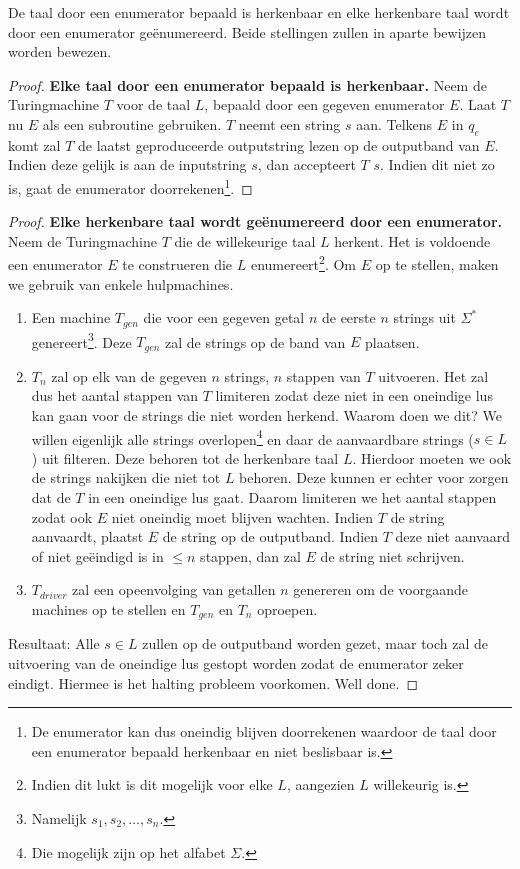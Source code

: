 \begin{theorem}
	De taal door een enumerator bepaald is herkenbaar en elke herkenbare taal wordt door een enumerator ge\"enumereerd. Beide stellingen zullen in aparte bewijzen worden bewezen.
\end{theorem}

\begin{proof}
	\textbf{Elke taal door een enumerator bepaald is herkenbaar.} Neem de Turingmachine $T$ voor de taal $L$, bepaald door een gegeven enumerator $E$. Laat $T$ nu $E$ als een subroutine gebruiken. $T$ neemt een string $s$ aan. Telkens $E$ in $q_e$ komt zal $T$ de laatst geproduceerde outputstring lezen op de outputband van $E$. Indien deze gelijk is aan de inputstring $s$, dan accepteert $T$ $s$. Indien dit niet zo is, gaat de enumerator doorrekenen\footnote{De enumerator kan dus oneindig blijven doorrekenen waardoor de taal door een enumerator bepaald herkenbaar en niet beslisbaar is.}.
\end{proof}

\begin{proof}
	\textbf{Elke herkenbare taal wordt ge\"enumereerd door een enumerator.} Neem de Turingmachine $T$ die de willekeurige taal $L$ herkent. Het is voldoende een enumerator $E$ te construeren die $L$ enumereert\footnote{Indien dit lukt is dit mogelijk voor elke $L$, aangezien $L$ willekeurig is.}. Om $E$ op te stellen, maken we gebruik van enkele hulpmachines.\\
	\begin{enumerate}
		\item Een machine $T_{gen}$ die voor een gegeven getal $n$ de eerste $n$ strings uit $\Sigma^*$ genereert\footnote{Namelijk $s_1,s_2, \dots ,s_n$.}. Deze $T_{gen}$ zal de strings op de band van $E$ plaatsen.
		\item $T_n$  zal op elk van de gegeven $n$ strings, $n$ stappen van $T$ uitvoeren. Het zal dus het aantal stappen van $T$ limiteren zodat deze niet in een oneindige lus kan gaan voor de strings die niet worden herkend. Waarom doen we dit? We willen eigenlijk alle strings overlopen\footnote{Die mogelijk zijn op het alfabet $\Sigma$.} en daar de aanvaardbare strings ($s \in L$) uit filteren. Deze behoren tot de herkenbare taal $L$. Hierdoor moeten we ook de strings nakijken die niet tot $L$ behoren. Deze kunnen er echter voor zorgen dat de $T$ in een oneindige lus gaat. Daarom limiteren we het aantal stappen zodat ook $E$ niet oneindig moet blijven wachten. Indien $T$ de string aanvaardt, plaatst $E$ de string op de outputband. Indien $T$ deze niet aanvaard of niet ge\"eindigd is in $\leq n$ stappen, dan zal $E$ de string niet schrijven.
		\item $T_{driver}$ zal een opeenvolging van getallen $n$ genereren om de voorgaande machines op te stellen en $T_{gen}$ en $T_n$ oproepen.\\
	\end{enumerate}
	Resultaat: Alle $s \in L$ zullen op de outputband worden gezet, maar toch zal de uitvoering van de oneindige lus gestopt worden zodat de enumerator zeker eindigt. Hiermee is het halting probleem voorkomen. Well done.
\end{proof}

